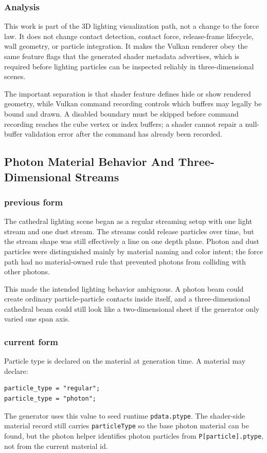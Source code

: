 \subsubsection{Analysis}

This work is part of the 3D lighting visualization path, not a change to the
force law.  It does not change contact detection, contact force, release-frame
lifecycle, wall geometry, or particle integration.  It makes the Vulkan
renderer obey the same feature flags that the generated shader metadata
advertises, which is required before lighting particles can be inspected
reliably in three-dimensional scenes.

The important separation is that shader feature defines hide or show rendered
geometry, while Vulkan command recording controls which buffers may legally be
bound and drawn.  A disabled boundary must be skipped before command
recording reaches the cube vertex or index buffers; a shader cannot repair a
null-buffer validation error after the command has already been recorded.

\subsection{Photon Material Behavior And Three-Dimensional Streams}

\subsubsection{previous form}

The cathedral lighting scene began as a regular streaming setup with one light
stream and one dust stream.  The streams could release particles over time, but
the stream shape was still effectively a line on one depth plane.  Photon and
dust particles were distinguished mainly by material naming and color intent;
the force path had no material-owned rule that prevented photons from
colliding with other photons.

This made the intended lighting behavior ambiguous.  A photon beam could create
ordinary particle-particle contacts inside itself, and a three-dimensional
cathedral beam could still look like a two-dimensional sheet if the generator
only varied one span axis.

\subsubsection{current form}

Particle type is declared on the material at generation time.  A material may
declare:
\begin{verbatim}
particle_type = "regular";
particle_type = "photon";
\end{verbatim}
The generator uses this value to seed runtime \texttt{pdata.ptype}.  The
shader-side material record still carries \texttt{particleType} so the base
photon material can be found, but the photon helper identifies photon
particles from \texttt{P[particle].ptype}, not from the current material id.

